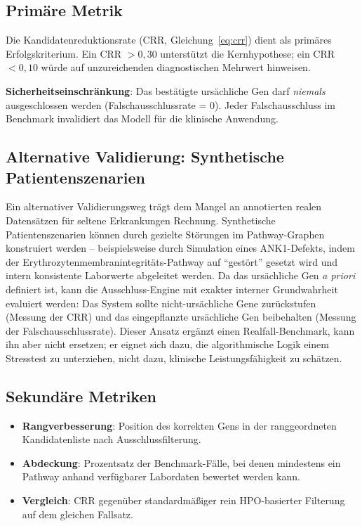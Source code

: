 \documentclass[12pt,a4paper]{article}
\begin{document}
\subsection{Primäre Metrik}

Die Kandidatenreduktionsrate (CRR, Gleichung~\eqref{eq:crr}) dient als primäres Erfolgskriterium. Ein CRR $> 0{,}30$ unterstützt die Kernhypothese; ein CRR $< 0{,}10$ würde auf unzureichenden diagnostischen Mehrwert hinweisen.

\textbf{Sicherheitseinschränkung}: Das bestätigte ursächliche Gen darf \emph{niemals} ausgeschlossen werden (Falschausschlussrate = 0). Jeder Falschausschluss im Benchmark invalidiert das Modell für die klinische Anwendung.

\subsection{Alternative Validierung: Synthetische Patientenszenarien}

Ein alternativer Validierungsweg trägt dem Mangel an annotierten realen Datensätzen für seltene Erkrankungen Rechnung. Synthetische Patientenszenarien können durch gezielte Störungen im Pathway-Graphen konstruiert werden -- beispielsweise durch Simulation eines ANK1-Defekts, indem der Erythrozytenmembranintegritäts-Pathway auf "`gestört"' gesetzt wird und intern konsistente Laborwerte abgeleitet werden. Da das ursächliche Gen \emph{a priori} definiert ist, kann die Ausschluss-Engine mit exakter interner Grundwahrheit evaluiert werden: Das System sollte nicht-ursächliche Gene zurückstufen (Messung der CRR) und das eingepflanzte ursächliche Gen beibehalten (Messung der Falschausschlussrate). Dieser Ansatz ergänzt einen Realfall-Benchmark, kann ihn aber nicht ersetzen; er eignet sich dazu, die algorithmische Logik einem Stresstest zu unterziehen, nicht dazu, klinische Leistungsfähigkeit zu schätzen.

\subsection{Sekundäre Metriken}

\begin{itemize}
    \item \textbf{Rangverbesserung}: Position des korrekten Gens in der ranggeordneten Kandidatenliste nach Ausschlussfilterung.
    \item \textbf{Abdeckung}: Prozentsatz der Benchmark-Fälle, bei denen mindestens ein Pathway anhand verfügbarer Labordaten bewertet werden kann.
    \item \textbf{Vergleich}: CRR gegenüber standardmäßiger rein HPO-basierter Filterung auf dem gleichen Fallsatz.
\end{itemize}
\end{document}

